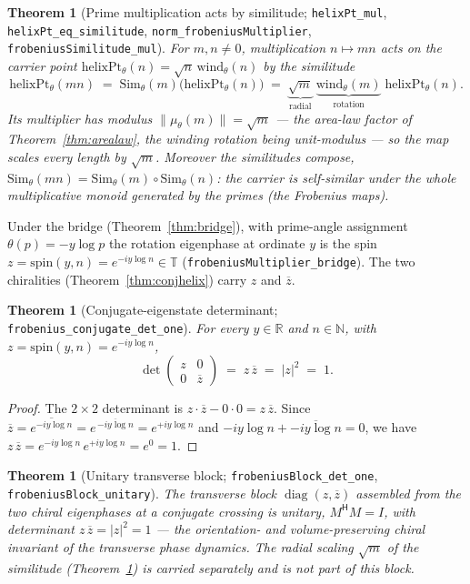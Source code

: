 \documentclass[11pt]{article}
\newtheorem{theorem}[definition]{Theorem}
\DeclareMathOperator{\diag}{diag}
\newcommand{\R}{\mathbb{R}}
\newcommand{\N}{\mathbb{N}}
\newcommand{\T}{\mathbb{T}}
\newcommand{\conj}[1]{\overline{#1}}
\newcommand{\code}[1]{\texttt{#1}}
\begin{document}
\begin{theorem}[Prime multiplication acts by similitude; \code{helixPt\_mul}, \code{helixPt\_eq\_similitude}, \code{norm\_frobeniusMultiplier}, \code{frobeniusSimilitude\_mul}]\label{thm:simil}
For $m,n\neq0$, multiplication $n\mapsto mn$ acts on the carrier point
$\mathrm{helixPt}_\theta(n)=\sqrt n\,\mathrm{wind}_\theta(n)$ by the similitude
\[
  \mathrm{helixPt}_\theta(mn) \;=\; \mathrm{Sim}_\theta(m)\bigl(\mathrm{helixPt}_\theta(n)\bigr)
   \;=\; \underbrace{\sqrt m}_{\text{radial}}\;\underbrace{\mathrm{wind}_\theta(m)}_{\text{rotation}}\;\mathrm{helixPt}_\theta(n).
\]
Its multiplier has modulus $\lVert\mu_\theta(m)\rVert=\sqrt m$ --- the area-law factor of
Theorem~\ref{thm:arealaw}, the winding rotation being unit-modulus --- so the map scales every length
by $\sqrt m$. Moreover the similitudes \emph{compose},
$\mathrm{Sim}_\theta(mn)=\mathrm{Sim}_\theta(m)\circ\mathrm{Sim}_\theta(n)$: the carrier is
\emph{self-similar} under the whole multiplicative monoid generated by the primes (the Frobenius maps).
\end{theorem}

Under the bridge (Theorem~\ref{thm:bridge}), with prime-angle assignment $\theta(p)=-y\log p$ the
rotation eigenphase at ordinate $y$ is the spin $z=\mathrm{spin}(y,n)=e^{-iy\log n}\in\T$
(\code{frobeniusMultiplier\_bridge}). The two chiralities (Theorem~\ref{thm:conjhelix}) carry
$z$ and $\conj z$.

\begin{theorem}[Conjugate-eigenstate determinant; \code{frobenius\_conjugate\_det\_one}]\label{thm:det}
For every $y\in\R$ and $n\in\N$, with $z=\mathrm{spin}(y,n)=e^{-iy\log n}$,
\[
  \det
  \begin{pmatrix} z & 0\\[2pt] 0 & \conj z \end{pmatrix}
  \;=\; z\,\conj z \;=\; |z|^2 \;=\; 1 .
\]
\end{theorem}

\begin{proof}
The $2\times2$ determinant is $z\cdot\conj z-0\cdot0=z\,\conj z$. Since $\conj z=\conj{e^{-iy\log n}}
=e^{\,\conj{-iy\log n}}=e^{+iy\log n}$ and $-iy\log n+\overline{-iy\log n}=0$, we have
$z\,\conj z=e^{-iy\log n}\,e^{+iy\log n}=e^{0}=1$.
\end{proof}

\begin{theorem}[Unitary transverse block; \code{frobeniusBlock\_det\_one}, \code{frobeniusBlock\_unitary}]\label{thm:unitary}
The transverse block $\diag(z,\conj z)$ assembled from the two chiral eigenphases at a conjugate
crossing is \emph{unitary}, $M^{\mathsf H}M=I$, with determinant $z\,\conj z=|z|^2=1$ --- the
orientation- and volume-preserving chiral invariant of the transverse phase dynamics. The radial
scaling $\sqrt m$ of the similitude (Theorem~\ref{thm:simil}) is carried separately and is not part of
this block.
\end{theorem}
\end{document}
